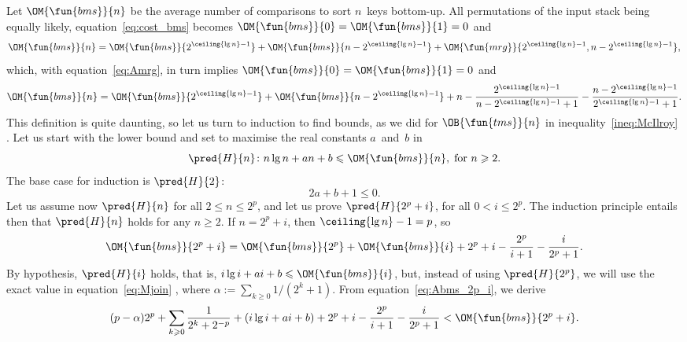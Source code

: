 Let \(\OM{\fun{bms}}{n}\) be the average number of comparisons to sort
\(n\)~keys bottom\hyp{}up. All permutations of the input stack being
equally likely, equation~\eqref{eq:cost_bms} 
becomes \(\OM{\fun{bms}}{0} = \OM{\fun{bms}}{1} = 0\) and
\begin{equation*}
\OM{\fun{bms}}{n} = \OM{\fun{bms}}{2^{\ceiling{\lg n}-1}}
+ \OM{\fun{bms}}{n - 2^{\ceiling{\lg n}-1}}
+ \OM{\fun{mrg}}{2^{\ceiling{\lg n}-1},n - 2^{\ceiling{\lg n}-1}},
\end{equation*}
which, with equation~\eqref{eq:Amrg}, in turn implies
\(\OM{\fun{bms}}{0} = \OM{\fun{bms}}{1} = 0\) and
\begin{equation*}
\OM{\fun{bms}}{n} = \OM{\fun{bms}}{2^{\ceiling{\lg n}-1}}
+ \OM{\fun{bms}}{n - 2^{\ceiling{\lg n}-1}}
+ n - \frac{2^{\ceiling{\lg n}-1}}{n - 2^{\ceiling{\lg n}-1} + 1}
- \frac{n - 2^{\ceiling{\lg n}-1}}{2^{\ceiling{\lg n}-1}+1}.
\end{equation*}
This definition is quite daunting, so let us turn to induction to find
bounds, as we did for \(\OB{\fun{tms}}{n}\) in
inequality~\eqref{ineq:McIlroy} . Let us start
with the lower bound and set to maximise the real constants
\(a\)~and~\(b\) in
\begin{equation*}
\pred{H}{n} \colon n\lg n + an + b \leqslant \OM{\fun{bms}}{n},
\; \text{for \(n \geqslant 2\).}
\end{equation*}
The base case for induction is \(\pred{H}{2}\):
\begin{equation}
2a + b + 1 \leqslant 0.
\label{ineq:base_lower_Btms}
\end{equation}
Let us assume now \(\pred{H}{n}\) for all \(2 \leqslant n \leqslant
2^p\), and let us prove \(\pred{H}{2^p+i}\), for all \(0 < i \leqslant
2^p\). The induction principle entails then that \(\pred{H}{n}\)
holds for any \(n \geqslant 2\). If \(n=2^p+i\), then \(\ceiling{\lg
  n} - 1 = p\), so
\begin{equation}
\OM{\fun{bms}}{2^p+i} = \OM{\fun{bms}}{2^p} + \OM{\fun{bms}}{i}
+ 2^p + i - \frac{2^p}{i+1} - \frac{i}{2^p+1}.
\label{eq:Abms_2p_i}
\end{equation}
By hypothesis, \(\pred{H}{i}\) holds, that is, \(i\lg i + ai + b
\leqslant \OM{\fun{bms}}{i}\), but, instead of using
\(\pred{H}{2^p}\), we will use the exact value in
equation~\eqref{eq:Mjoin} , where \(\alpha :=
\sum_{k \geqslant 0}1/(2^k+1)\). From equation~\eqref{eq:Abms_2p_i},
we derive
\begin{equation*}
(p-\alpha)2^p + \sum_{k \geqslant
    0}\frac{1}{2^{k}+2^{-p}}
+ (i\lg i + ai + b) + 2^p + i -
\frac{2^p}{i+1} - \frac{i}{2^p+1} < \OM{\fun{bms}}{2^p+i}.
\end{equation*}
